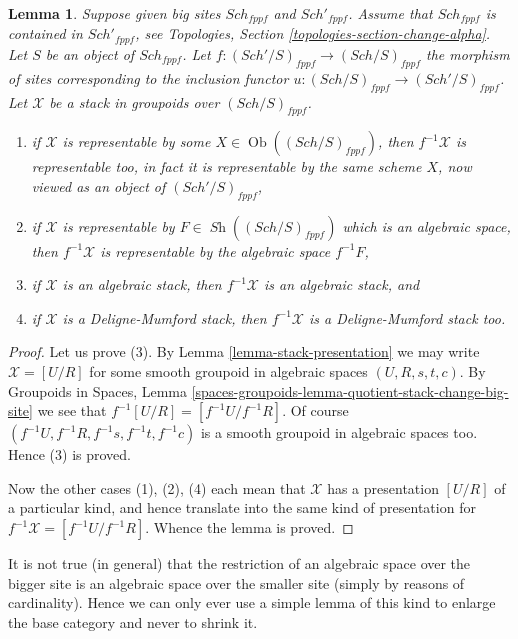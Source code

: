 \documentclass{stacks-project}
\theoremstyle{plain}
\newtheorem{lemma}[subsection]{Lemma}
\theoremstyle{definition}
\theoremstyle{remark}
\numberwithin{equation}{subsection}
\def\Sch{\mathit{Sch}}
\def\Ob{\mathop{\mathrm{Ob}}\nolimits}
\def\Sh{\mathop{\mathit{Sh}}\nolimits}
\begin{document}
\begin{lemma}
\label{lemma-change-big-site}
Suppose given big sites $\Sch_{fppf}$ and $\Sch'_{fppf}$.
Assume that $\Sch_{fppf}$ is contained in $\Sch'_{fppf}$,
see Topologies, Section \ref{topologies-section-change-alpha}.
Let $S$ be an object of $\Sch_{fppf}$.
Let $f : (\Sch'/S)_{fppf} \to (\Sch/S)_{fppf}$ the morphism
of sites corresponding to the inclusion functor
$u : (\Sch/S)_{fppf} \to (\Sch'/S)_{fppf}$.
Let $\mathcal{X}$ be a stack in groupoids over $(\Sch/S)_{fppf}$.
\begin{enumerate}
\item if $\mathcal{X}$ is representable by some
$X \in \Ob((\Sch/S)_{fppf})$, then
$f^{-1}\mathcal{X}$ is representable too, in fact it is representable by the
same scheme $X$, now viewed as an object of $(\Sch'/S)_{fppf}$,
\item if $\mathcal{X}$ is representable by
$F \in \Sh((\Sch/S)_{fppf})$ which is
an algebraic space, then $f^{-1}\mathcal{X}$ is representable
by the algebraic space $f^{-1}F$,
\item if $\mathcal{X}$ is an algebraic stack, then $f^{-1}\mathcal{X}$
is an algebraic stack, and
\item if $\mathcal{X}$ is a Deligne-Mumford stack, then $f^{-1}\mathcal{X}$
is a Deligne-Mumford stack too.
\end{enumerate}
\end{lemma}

\begin{proof}
Let us prove (3). By
Lemma \ref{lemma-stack-presentation}
we may write $\mathcal{X} = [U/R]$ for some smooth
groupoid in algebraic spaces $(U, R, s, t, c)$. By
Groupoids in Spaces,
Lemma \ref{spaces-groupoids-lemma-quotient-stack-change-big-site}
we see that $f^{-1}[U/R] = [f^{-1}U/f^{-1}R]$.
Of course $(f^{-1}U, f^{-1}R, f^{-1}s, f^{-1}t, f^{-1}c)$
is a smooth groupoid in algebraic spaces too. Hence (3) is proved.

\medskip\noindent
Now the other cases (1), (2), (4) each mean that $\mathcal{X}$ has
a presentation $[U/R]$ of a particular kind, and hence translate into the
same kind of presentation for $f^{-1}\mathcal{X} = [f^{-1}U/f^{-1}R]$.
Whence the lemma is proved.
\end{proof}

\noindent
It is not true (in general) that the restriction of an algebraic space
over the bigger site is an algebraic space over the smaller site (simply
by reasons of cardinality). Hence we can only ever use a simple lemma of this
kind to enlarge the base category and never to shrink it.
\end{document}
